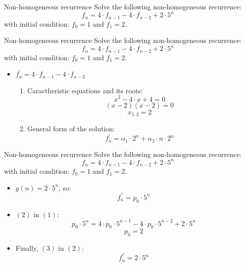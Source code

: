 \documentclass{beamer}
\begin{document}
\begin{frame}{Non-homogeneous recurrence}
    Solve the following non-homogeneous recurrence:
    \begin{equation}\tag{1}
        f_n = 4 \cdot f_{n-1} - 4 \cdot f_{n-2} + 2 \cdot 5^n
    \end{equation}
    with initial condition: $f_0 = 1$ and $f_1 = 2$.
\end{frame}

\begin{frame}{Non-homogeneous recurrence}
    Solve the following non-homogeneous recurrence:
    \begin{equation}\tag{1}
        f_n = 4 \cdot f_{n-1} - 4 \cdot f_{n-2} + 2 \cdot 5^n
    \end{equation}
    with initial condition: $f_0 = 1$ and $f_1 = 2$.
    
    \begin{itemize}
        \item $ f_n^{'} =  4 \cdot f_{n-1} - 4 \cdot f_{n-2}$
        \begin{enumerate}
            \item Caractheristic equations and its roots:
                $$ x^2 - 4 \cdot x + 4 = 0 $$
                $$ (x - 2)(x - 2) = 0 $$
                $$ x_{1,2} = 2 $$
            \item General form of the solution:
                $$ f_n^{'} = \alpha_1 \cdot 2^n + \alpha_2 \cdot n \cdot 2^n $$
        \end{enumerate}
    \end{itemize}
\end{frame}

\begin{frame}{Non-homogeneous recurrence}
    Solve the following non-homogeneous recurrence:
    \begin{equation}\tag{1}
        f_n = 4 \cdot f_{n-1} - 4 \cdot f_{n-2} + 2 \cdot 5^n
    \end{equation}
    with initial condition: $f_0 = 1$ and $f_1 = 2$.
    
    \begin{itemize}
        \item $ g(n) =  2 \cdot 5^n$, so:
            \begin{equation}\tag{2}
                f_n^{''} = p_0 \cdot 5^n
            \end{equation}
        \item $(2)$ in $(1)$:
            $$ p_0 \cdot 5^n = 4 \cdot p_0 \cdot 5^{n-1} - 4 \cdot p_0 \cdot 5^{n-2} + 2 \cdot 5^n $$
            \begin{equation}\tag{3}
                p_0 = 2
            \end{equation}
        \item Finally, $(3)$ in $(2)$:
            $$ f_n^{''} = 2 \cdot 5^n $$
    \end{itemize}

\end{frame}
\end{document}
